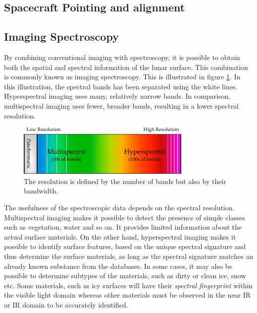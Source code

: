 \subsection{Spacecraft Pointing and alignment}
\subsection{Imaging Spectroscopy}\label{sec:imaging_spectroscopy}
By combining conventional imaging with spectroscopy, it is possible to obtain both the spatial and spectral information of the lunar surface. This combination is commonly known as imaging spectroscopy. This is illustrated in figure \ref{fig:spectral_information}. In this illustration, the spectral bands has been separated using the white lines. Hyperspectral imaging uses many, relatively narrow bands. In comparison, multispectral imaging uses fewer, broader bands, resulting in a lower spectral resolution. 
\begin{figure}[htb]
\centering
\includegraphics[width=0.75\textwidth]{figures/Orbiter/spectral_information}
\caption{The resolution is defined by the number of bands but also by their bandwidth.}
\label{fig:spectral_information}
\end{figure}
The usefulness of the spectroscopic data depends on the spectral resolution\cite{elowitz2016}. Multispectral imaging makes it possible to detect the presence of simple classes such as vegetation, water and so on. It provides limited information about the actual surface materials. On the other hand, hyperspectral imaging makes it possible to identify surface features, based on the unique spectral signature and thus determine the surface materials, as long as the spectral signature matches an already known substance from the databases. In some cases, it may also be possible to determine subtypes of the materials, such as dirty or clean ice, snow etc\cite{naegeli2015a}. Some materials, such as icy surfaces will have their \textit{spectral fingerprint} within the visible light domain whereas other materials must be observed in the near IR or IR domain to be accurately identified.

